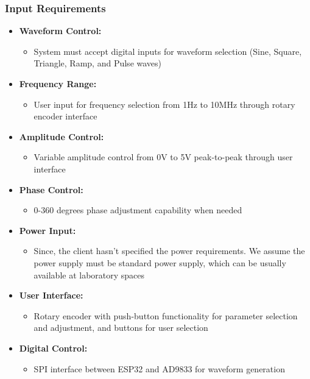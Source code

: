 \documentclass[a4paper,12pt]{article}
\begin{document}
\subsubsection{Input Requirements}
\begin{itemize}
    \item \textbf{Waveform Control:}
    \begin{itemize}
        \item System must accept digital inputs for waveform selection (Sine, Square, Triangle, Ramp, and Pulse waves)
    \end{itemize}
    \item \textbf{Frequency Range:}
    \begin{itemize}
        \item User input for frequency selection from 1Hz to 10MHz through rotary encoder interface
    \end{itemize}
    \item \textbf{Amplitude Control:}
    \begin{itemize}
        \item Variable amplitude control from 0V to 5V peak-to-peak through user interface
    \end{itemize}
    \item \textbf{Phase Control:}
    \begin{itemize}
        \item 0-360 degrees phase adjustment capability when needed
    \end{itemize}
    \item \textbf{Power Input:}
    \begin{itemize}
        \item Since, the client hasn’t specified the power requirements. We assume the power supply must be standard power supply, which can be usually available at laboratory spaces
    \end{itemize}
    \item \textbf{User Interface:}
    \begin{itemize}
        \item Rotary encoder with push-button functionality for parameter selection and adjustment, and buttons for user selection
    \end{itemize}
    \item \textbf{Digital Control:}
    \begin{itemize}
        \item SPI interface between ESP32 and AD9833 for waveform generation
    \end{itemize}
\end{itemize}
\end{document}
